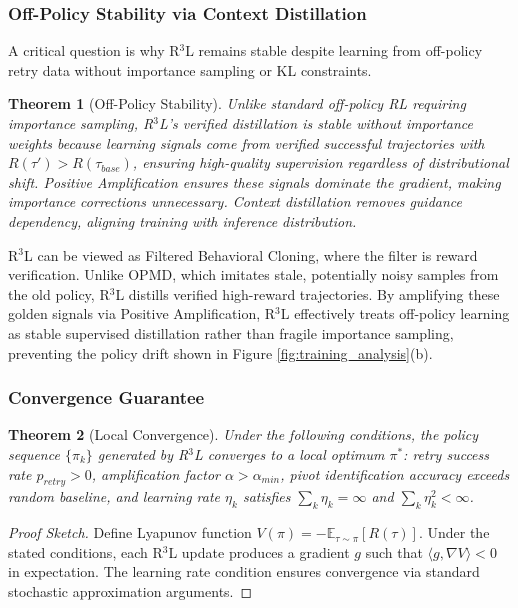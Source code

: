 \documentclass[11pt]{article}
\newtheorem{theorem}{Theorem}
\theoremstyle{definition}
\theoremstyle{remark}
\begin{document}
\subsubsection{Off-Policy Stability via Context Distillation}
\label{sec:context_distillation}

A critical question is why R$^3$L remains stable despite learning from off-policy retry data without importance sampling or KL constraints.

\begin{theorem}[Off-Policy Stability]
\label{thm:offpolicy_stability}
Unlike standard off-policy RL requiring importance sampling, R$^3$L's verified distillation is stable without importance weights because learning signals come from verified successful trajectories with $R(\tau') > R(\tau_{base})$, ensuring high-quality supervision regardless of distributional shift. Positive Amplification ensures these signals dominate the gradient, making importance corrections unnecessary. Context distillation removes guidance dependency, aligning training with inference distribution.
\end{theorem}

R$^3$L can be viewed as Filtered Behavioral Cloning, where the filter is reward verification. Unlike OPMD, which imitates stale, potentially noisy samples from the old policy, R$^3$L distills verified high-reward trajectories. By amplifying these golden signals via Positive Amplification, R$^3$L effectively treats off-policy learning as stable supervised distillation rather than fragile importance sampling, preventing the policy drift shown in Figure \ref{fig:training_analysis}(b).

\subsubsection{Convergence Guarantee}
\label{sec:convergence}

\begin{theorem}[Local Convergence]
\label{thm:convergence}
Under the following conditions, the policy sequence $\{\pi_k\}$ generated by R$^3$L converges to a local optimum $\pi^*$: retry success rate $p_{retry} > 0$, amplification factor $\alpha > \alpha_{min}$, pivot identification accuracy exceeds random baseline, and learning rate $\eta_k$ satisfies $\sum_k \eta_k = \infty$ and $\sum_k \eta_k^2 < \infty$.
\end{theorem}

\begin{proof}[Proof Sketch]
Define Lyapunov function $V(\pi) = -\mathbb{E}_{\tau \sim \pi}[R(\tau)]$. Under the stated conditions, each R$^3$L update produces a gradient $g$ such that $\langle g, \nabla V \rangle < 0$ in expectation. The learning rate condition ensures convergence via standard stochastic approximation arguments.
\end{proof}
\end{document}
